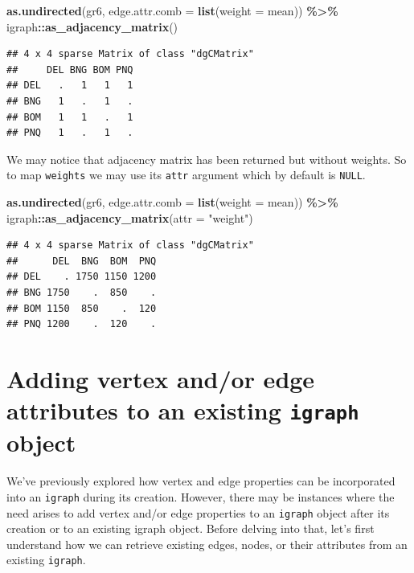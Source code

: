 \documentclass[
]{book}
\newenvironment{Shaded}{\begin{snugshade}}{\end{snugshade}}
\newcommand{\AttributeTok}[1]{\textcolor[rgb]{0.13,0.29,0.53}{#1}}
\newcommand{\FunctionTok}[1]{\textcolor[rgb]{0.13,0.29,0.53}{\textbf{#1}}}
\newcommand{\NormalTok}[1]{#1}
\newcommand{\SpecialCharTok}[1]{\textcolor[rgb]{0.81,0.36,0.00}{\textbf{#1}}}
\newcommand{\StringTok}[1]{\textcolor[rgb]{0.31,0.60,0.02}{#1}}
\begin{document}
\begin{Shaded}
\begin{Highlighting}[]
\FunctionTok{as.undirected}\NormalTok{(gr6, }\AttributeTok{edge.attr.comb =} \FunctionTok{list}\NormalTok{(}\AttributeTok{weight =}\NormalTok{ mean)) }\SpecialCharTok{\%\textgreater{}\%}
\NormalTok{  igraph}\SpecialCharTok{::}\FunctionTok{as\_adjacency\_matrix}\NormalTok{()}
\end{Highlighting}
\end{Shaded}

\begin{verbatim}
## 4 x 4 sparse Matrix of class "dgCMatrix"
##     DEL BNG BOM PNQ
## DEL   .   1   1   1
## BNG   1   .   1   .
## BOM   1   1   .   1
## PNQ   1   .   1   .
\end{verbatim}

We may notice that adjacency matrix has been returned but without weights. So to map \texttt{weights} we may use its \texttt{attr} argument which by default is \texttt{NULL}.

\begin{Shaded}
\begin{Highlighting}[]
\FunctionTok{as.undirected}\NormalTok{(gr6, }\AttributeTok{edge.attr.comb =} \FunctionTok{list}\NormalTok{(}\AttributeTok{weight =}\NormalTok{ mean)) }\SpecialCharTok{\%\textgreater{}\%}
\NormalTok{  igraph}\SpecialCharTok{::}\FunctionTok{as\_adjacency\_matrix}\NormalTok{(}\AttributeTok{attr =} \StringTok{"weight"}\NormalTok{)}
\end{Highlighting}
\end{Shaded}

\begin{verbatim}
## 4 x 4 sparse Matrix of class "dgCMatrix"
##      DEL  BNG  BOM  PNQ
## DEL    . 1750 1150 1200
## BNG 1750    .  850    .
## BOM 1150  850    .  120
## PNQ 1200    .  120    .
\end{verbatim}

\hypertarget{adding-vertex-andor-edge-attributes-to-an-existing-igraph-object}{%
\section{\texorpdfstring{Adding vertex and/or edge attributes to an existing \texttt{igraph} object}{Adding vertex and/or edge attributes to an existing igraph object}}\label{adding-vertex-andor-edge-attributes-to-an-existing-igraph-object}}

We've previously explored how vertex and edge properties can be incorporated into an \texttt{igraph} during its creation. However, there may be instances where the need arises to add vertex and/or edge properties to an \texttt{igraph} object after its creation or to an existing igraph object. Before delving into that, let's first understand how we can retrieve existing edges, nodes, or their attributes from an existing \texttt{igraph}.
\end{document}
